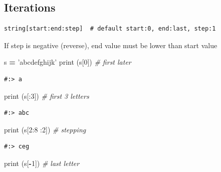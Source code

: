 \documentclass[
]{book}
\newenvironment{Shaded}{\begin{snugshade}}{\end{snugshade}}
\newcommand{\BuiltInTok}[1]{#1}
\newcommand{\CommentTok}[1]{\textcolor[rgb]{0.37,0.37,0.37}{\textit{#1}}}
\newcommand{\DecValTok}[1]{\textcolor[rgb]{0.06,0.06,0.06}{#1}}
\newcommand{\NormalTok}[1]{#1}
\newcommand{\OperatorTok}[1]{\textcolor[rgb]{0.43,0.43,0.43}{\textbf{#1}}}
\newcommand{\StringTok}[1]{\textcolor[rgb]{0.5,0.5,0.5}{#1}}
\begin{document}
\hypertarget{iterations}{%
\subsection{Iterations}\label{iterations}}

\begin{verbatim}
string[start:end:step]  # default start:0, end:last, step:1
\end{verbatim}

If step is negative (reverse), end value must be lower than start value

\begin{Shaded}
\begin{Highlighting}[]
\NormalTok{s }\OperatorTok{=} \StringTok{'abcdefghijk'}
\BuiltInTok{print}\NormalTok{ (s[}\DecValTok{0}\NormalTok{])       }\CommentTok{# first later}
\end{Highlighting}
\end{Shaded}

\begin{verbatim}
#:> a
\end{verbatim}

\begin{Shaded}
\begin{Highlighting}[]
\BuiltInTok{print}\NormalTok{ (s[:}\DecValTok{3}\NormalTok{])      }\CommentTok{# first 3 letters}
\end{Highlighting}
\end{Shaded}

\begin{verbatim}
#:> abc
\end{verbatim}

\begin{Shaded}
\begin{Highlighting}[]
\BuiltInTok{print}\NormalTok{ (s[}\DecValTok{2}\NormalTok{:}\DecValTok{8}\NormalTok{ :}\DecValTok{2}\NormalTok{])  }\CommentTok{# stepping}
\end{Highlighting}
\end{Shaded}

\begin{verbatim}
#:> ceg
\end{verbatim}

\begin{Shaded}
\begin{Highlighting}[]
\BuiltInTok{print}\NormalTok{ (s[}\OperatorTok{-}\DecValTok{1}\NormalTok{])      }\CommentTok{# last letter}
\end{Highlighting}
\end{Shaded}
\end{document}
